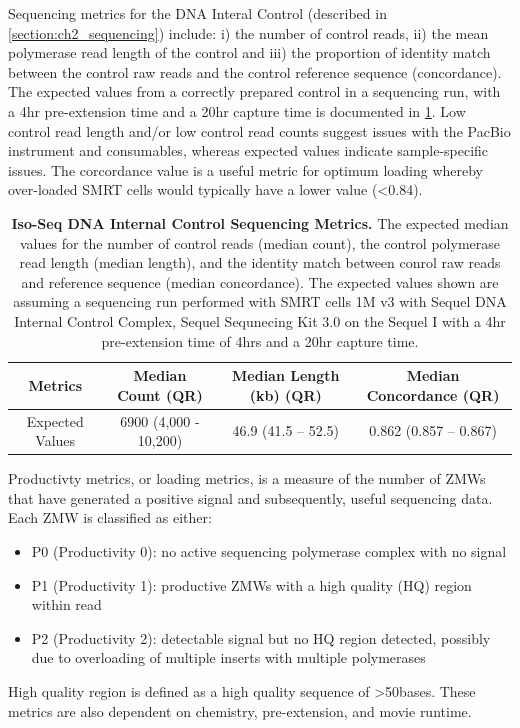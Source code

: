 Sequencing metrics for the DNA Interal Control (described in \cref{section:ch2_sequencing}) include: i) the number of control reads, ii) the mean polymerase read length of the control and iii) the proportion of identity match between the control raw reads and the control reference sequence (concordance). The expected values from a correctly prepared control in a sequencing run, with a 4hr pre-extension time and a 20hr capture time is documented in \cref{tab:control_Isoseqmetrics}. Low control read length and/or low control read counts suggest issues with the PacBio instrument and consumables, whereas expected values indicate sample-specific issues. The corcordance value is a useful metric for optimum loading whereby over-loaded SMRT cells would typically have a lower value (<0.84).

\begin{table}[!h]
	\caption[Iso-Seq DNA Internal Control Sequencing Metrics]%
	{\textbf{Iso-Seq DNA Internal Control Sequencing Metrics.} The expected median values for the number of control reads (median count), the control polymerase read length (median length), and the identity match between conrol raw reads and reference sequence (median concordance). The expected values shown are assuming a sequencing run performed with SMRT cells 1M v3 with Sequel DNA Internal Control Complex, Sequel Sequnecing Kit 3.0 on the Sequel I with a 4hr pre-extension time of 4hrs and a 20hr capture time.}
	\label{tab:control_Isoseqmetrics}
	
	\centering
	\begin{tabular}{@{}cccc@{}}
		\toprule
		Metrics         & Median Count (QR)     & Median Length (kb) (QR) & Median Concordance (QR) \\ \midrule
		Expected Values & 6900 (4,000 - 10,200) & 46.9 (41.5 – 52.5) & 0.862 (0.857 – 0.867)   \\ \bottomrule
	\end{tabular}
\end{table}


Productivty metrics, or loading metrics, is a measure of the number of ZMWs that have generated a positive signal and subsequently, useful sequencing data. Each ZMW is classified as either: 
\begin{itemize}
	\item P0 (Productivity 0): no active sequencing polymerase complex with no signal 
	\item P1 (Productivity 1): productive ZMWs with a high quality (HQ) region within read 
	\item P2 (Productivity 2): detectable signal but no HQ region detected, possibly due to overloading of multiple inserts with multiple polymerases
\end{itemize}
High quality region is defined as a high quality sequence of >50bases. These metrics are also dependent on chemistry, pre-extension, and movie runtime.  

